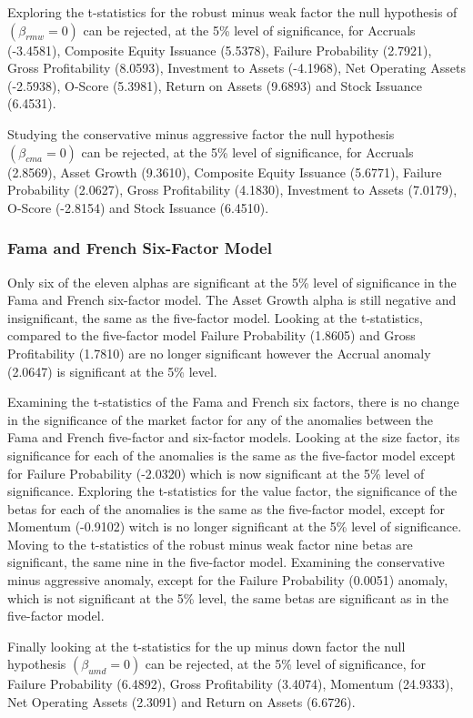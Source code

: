 \documentclass[a4paper]{article}                 %
\begin{document}
Exploring the t-statistics for the robust minus weak factor the null hypothesis of $(\beta_{rmw}= 0)$ can be rejected, at the 5\% level of significance, for Accruals (-3.4581), Composite Equity Issuance (5.5378), Failure Probability (2.7921), Gross Profitability (8.0593), Investment to Assets (-4.1968), Net Operating Assets (-2.5938), O-Score (5.3981), Return on Assets (9.6893) and Stock Issuance (6.4531).

Studying the conservative minus aggressive factor the null hypothesis $(\beta_{cma}= 0)$ can be rejected, at the 5\% level of significance, for Accruals (2.8569), Asset Growth (9.3610), Composite Equity Issuance (5.6771), Failure Probability (2.0627), Gross Profitability (4.1830), Investment to Assets (7.0179), O-Score (-2.8154) and Stock Issuance (6.4510).

\subsubsection{Fama and French Six-Factor Model}
Only six of the eleven alphas are significant at the 5\% level of significance in the Fama and French six-factor model. The Asset Growth alpha is still negative and insignificant, the same as the five-factor model. Looking at the t-statistics, compared to the five-factor model Failure Probability (1.8605) and Gross Profitability (1.7810) are no longer significant however the Accrual anomaly (2.0647) is significant at the 5\% level.

Examining the t-statistics of the Fama and French six factors, there is no change in the significance of the market factor for any of the anomalies between the Fama and French five-factor and six-factor models. Looking at the size factor, its significance for each of the anomalies is the same as the five-factor model except for Failure Probability (-2.0320) which is now significant at the 5\% level of significance. Exploring the t-statistics for the value factor, the significance of the betas for each of the anomalies is the same as the five-factor model, except for Momentum (-0.9102) witch is no longer significant at the 5\% level of significance. Moving to the t-statistics of the robust minus weak factor nine betas are significant, the same nine in the five-factor model. Examining the conservative minus aggressive anomaly, except for the Failure Probability (0.0051) anomaly, which is not significant at the 5\% level, the same betas are significant as in the five-factor model.

Finally looking at the t-statistics for the up minus down factor the null hypothesis $(\beta_{umd}= 0)$ can be rejected, at the 5\% level of significance, for Failure Probability (6.4892), Gross Profitability (3.4074), Momentum (24.9333), Net Operating Assets (2.3091) and Return on Assets (6.6726).
\end{document}
